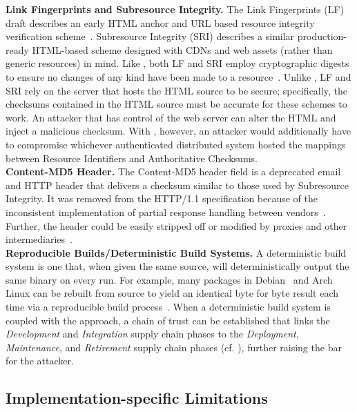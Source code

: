 \noindent\textbf{Link Fingerprints and Subresource Integrity.} The Link
Fingerprints (LF) draft describes an early HTML anchor and URL based resource
integrity verification scheme~\cite{LF}. Subresource Integrity (SRI) describes a
similar production-ready HTML-based scheme designed with CDNs and web assets
(rather than generic resources) in mind. Like \SYSTEM{}, both LF and SRI employ
cryptographic digests to ensure no changes of any kind have been made to a
resource~\cite{SRI}. Unlike \SYSTEM{}, LF and SRI rely on the server that hosts
the HTML source to be secure; specifically, the checksums contained in the HTML
source must be accurate for these schemes to work. An attacker that has control
of the web server can alter the HTML and inject a malicious checksum. With
\SYSTEM{}, however, an attacker would additionally have to compromise whichever
authenticated distributed system hosted the mappings between Resource
Identifiers and Authoritative Checksums. \\

\noindent\textbf{Content-MD5 Header.} The Content-MD5 header field is a
deprecated email and HTTP header that delivers a checksum similar to those used
by Subresource Integrity. It was removed from the HTTP/1.1 specification because
of the inconsistent implementation of partial response handling between
vendors~\cite{HTTP1.1}. Further, the header could be easily stripped off or
modified by proxies and other intermediaries~\cite{MD5Header}. \\

\noindent\textbf{Reproducible Builds/Deterministic Build Systems.} A
deterministic build system is one that, when given the same source, will
deterministically output the same binary on every run. For example, many
packages in Debian~\cite{ReproBuildsDebian} and Arch Linux can be rebuilt from
source to yield an identical byte for byte result each time via a reproducible
build process~\cite{ReproBuilds}. When a deterministic build system is coupled
with the \SYSTEM{} approach, a chain of trust can be established that links the
\emph{Development} and \emph{Integration} supply chain phases to the
\emph{Deployment}, \emph{Maintenance}, and \emph{Retirement} supply chain phases
(cf. ), further raising the bar for the attacker.

\subsection{Implementation-specific Limitations}

